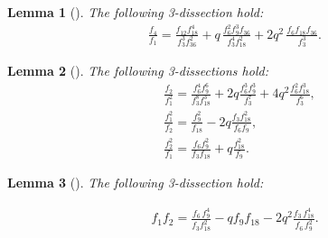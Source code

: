 \documentclass[11pt, reqno]{amsart}
\newtheorem{lma}{Lemma}[section]
\numberwithin{equation}{section}
\begin{document}
	\begin{lma}[{\cite{mdb}}] The following 3-dissection hold:
		\begin{align}
			\frac{f_4}{f_1}=\frac{f_{12}f_{18}^{4}}{f_3^{3}f_{36}^{2}}+q\,\frac{f_6^{2}f_9^{3}f_{36}}{f_3^{4}f_{18}^{2}}+2q^{2}\,\frac{f_6f_{18}f_{36}}{f_3^{3}}.\label{f4byf1}
	\end{align}\end{lma}
	\begin{lma}[{\cite{mdb}}] The following 3-dissections hold:
		\begin{align}
			&\frac{f_2}{f_1^2} = \frac{f_6^4 f_9^6}{f_3^8 f_{18}^3} + 2q \frac{f_6^3 f_9^3}{f_3^7} + 4q^2 \frac{f_6^2 f_{18}^3}{f_3^6},\label{f2byf12}\\
			&\frac{f_1^2}{f_2} = \frac{f_9^2}{f_{18}} - 2q \frac{f_3 f_{18}^2}{f_6 f_9},\label{f12byf2}\\
			&\frac{f_2^2}{f_1} = \frac{f_6f_9^2}{f_3f_{18}} +q \frac{ f_{18}^2}{ f_9}.\label{f22byf1}
	\end{align}\end{lma}
	\begin{lma} [{\cite{hirschhorn2014congruence}}] The following 3-dissection hold:
		
		\begin{align}
			f_1f_2=\frac{f_6\,f_9^4}{f_3f_{18}^2}
			-qf_9f_{18}-2q^2\frac{f_3\,f_{18}^4}{f_6\,f_9^2}.\label{f1f2}
		\end{align}
	\end{lma}
	
\end{document}
